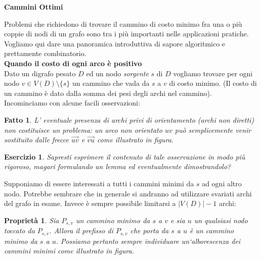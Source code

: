 \documentclass[10pt]{article}
\def\sm{\setminus}
\newtheorem{Ese}[Teo]{Esercizio}
\newtheorem{Fact}[Teo]{Fatto}
\newtheorem{Prop}[Teo]{Propriet\`a}
\begin{document}
\begin{center}
   {\LARGE \bf Cammini Ottimi}
\end{center}

Problemi che richiedono di trovare il cammino
di costo minimo fra una o pi\`u coppie di nodi
di un grafo sono tra i pi\`u importanti nelle applicazioni pratiche.
Vogliamo qui dare una panoramica introduttiva
di sapore algoritmico e prettamente combinatorio.\\

\noindent
{\LARGE \bf Quando il costo di ogni arco \`e positivo}\\

Dato un digrafo pesato $D$ 
ed un nodo {\em sorgente} $s$ di $D$
vogliamo trovare per ogni nodo $v\in V(D)\sm \{s\}$
un cammino che vada da $s$ a $v$ di costo minimo.
(Il costo di un cammino \`e dato dalla somma dei pesi
degli archi nel cammino).\\

Incominciamo con alcune facili osservazioni:

\begin{Fact}   \label{riduzione}
   L' eventuale presenza di archi privi di orientamento
   (archi non diretti)
   non costituisce un problema:
   un arco non orientato $uv$
   pu\`o semplicemente venir sostituito
   dalle frecce $\vec{uv}$  e $\vec{vu}$ come illustrato in figura. 
\end{Fact}

\begin{center}
\end{center}

\begin{Ese}
   Sapresti esprimere il contenuto di tale
   osservazione in modo pi\`u rigoroso,
   magari formulando un lemma
   ed eventualmente dimostrandolo?
\end{Ese}

Supponiamo di essere interessati a tutti i
cammini minimi da $s$ ad ogni altro nodo.
Potrebbe sembrare che in generale si andranno ad utilizzare
svariati archi del grafo in esame.
Invece \`e sempre possibile limitarsi a $|V(D)|-1$ archi:

\begin{Prop}
   Sia $P_{s,v}$ un cammino minimo da $s$ a $v$
   e sia $u$ un qualsiasi nodo toccato da $P_{s,v}$.
   Allora il prefisso di $P_{s,v}$ che porta
   da $s$ a $u$ \`e un cammino minimo da $s$ a $u$.
   Possiamo pertanto sempre individuare un`alborescenza dei
   cammini minimi come illustrato in figura. 
\end{Prop}
\end{document}
